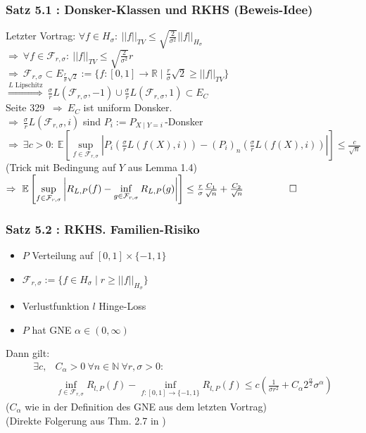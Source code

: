\documentclass{beamer}
\newcommand{\R}{\mathbb{R}} %
\newcommand{\N}{\mathbb{N}} %
\newcommand{\E}{\mathbb{E}} %
\newcommand{\F}{\mathcal{F}}
\begin{document}
	\begin{frame}
		\frametitle{Satz 5.1 : Donsker-Klassen und RKHS (Beweis-Idee)}
		Letzter Vortrag: $\forall f \in H_\sigma : \ ||f||_{TV} \leq \sqrt{\frac{2}{\sigma^2}} ||f||_{H_\sigma}$\\
		$\Rightarrow \ \forall f \in \F_{r,\sigma} : \ ||f||_{TV} \leq \sqrt{\frac{2}{\sigma^2}} r$\\
		$\Rightarrow \ \F_{r,\sigma} \subset E_{\frac{r}{\sigma}\sqrt{2}} := \{f : [0,1] \rightarrow \R \mid \frac{r}{\sigma}\sqrt{2} \geq ||f||_{TV} \}$\\
		$\overset{L\text{ Lipschitz}}{\Rightarrow} \ \frac{\sigma}{r} L(\F_{r,\sigma},-1) \cup \frac{\sigma}{r}L(\F_{r,\sigma},1) \subset E_{C}$\\
		\hfill\break
		\pause
		\cite{DudleyUCLT} Seite 329 $\ \Rightarrow \ E_{C}$ ist uniform Donsker.\\
		$\Rightarrow \ \frac{\sigma}{r} L(\F_{r,\sigma},i)$ sind $P_i:=P_{X\mid Y=i}\,$-Donsker\\
		$\Rightarrow \ \exists c >0 : \ \E\left[ \sup\limits_{f \in \F_{r,\sigma}} \left|P_i\left(\frac{\sigma}{r}L\left(f(X),i\right)\right)-\widehat{(P_i)}_{n}\left(\frac{\sigma}{r}L\left(f(X),i\right)\right) \right| \right] \leq \frac{c}{\sqrt{n}}$\\
		(Trick mit Bedingung auf $Y$ aus Lemma 1.4)\\
		$\Rightarrow \ \E\left[ \sup\limits_{f \in \F_{r,\sigma}} \left|R_{L,P}(f)-\inf\limits_{g \in  \F_{r,\sigma}} R_{L,P}(g) \right| \right] \leq \frac{r}{\sigma} \frac{C_1}{\sqrt{n}} + \frac{C_2}{\sqrt{n}} \ \ \ \ \ \ \ \  \qed$
	\end{frame}
	
	\begin{frame}
		\frametitle{Satz 5.2 : RKHS. Familien-Risiko}
		\begin{itemize}
			\item $P$ Verteilung auf $[0,1] \times \{-1,1\}$
			\item $\F_{r,\sigma} := \{f \in H_{\sigma} \mid r \geq ||f||_{H_{\sigma}} \}$
			\item Verlustfunktion $l$ Hinge-Loss
			\item $P$ hat GNE $\alpha \in (0,\infty)$
		\end{itemize}
		Dann gilt:
		\begin{align*}
		\exists c,&C_\alpha>0 \ \forall n \in \N \ \forall r,\sigma > 0 : \\
		& \inf_{f \in \F_{r,\sigma}} R_{l,P}(f) - \inf_{f:[0,1] \rightarrow \{-1,1\}}R_{l,P}(f) \leq c\left(\frac{1}{\sigma r^2} + C_\alpha 2^{\frac{\alpha}{2}} \sigma^{\alpha}\right)
		\end{align*}
		($C_\alpha$ wie in der Definition des GNE aus dem letzten Vortrag)\\
		(Direkte Folgerung aus Thm. 2.7 in \cite{St1})
	\end{frame}
\end{document}
